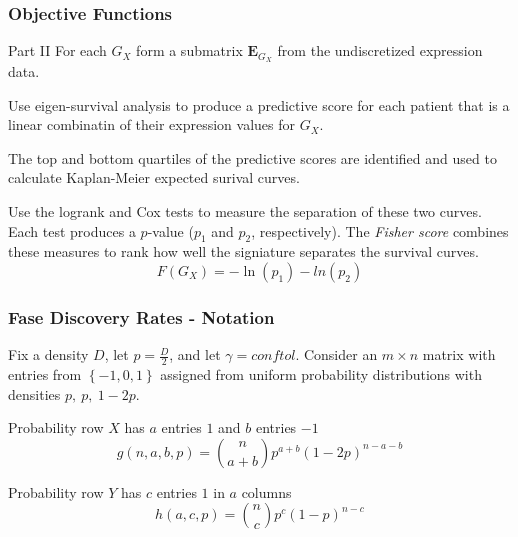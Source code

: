 \documentclass[
	11pt, %
]{beamer}
\begin{document}
\begin{frame}
    \frametitle{Objective Functions}
    \begin{block}{Part II}
        For each $G_X$ form a submatrix $\mathbf{E}_{G_X}$ from the undiscretized expression data.
        
        \smallskip
        
        Use eigen-survival analysis to produce a predictive score for each patient that is a linear combinatin of their expression values for $G_X$.

        \smallskip

        The top and bottom quartiles of the predictive scores are identified and used to calculate Kaplan-Meier expected surival curves.

        \smallskip

        Use the logrank and Cox tests to measure the separation of these two curves. Each test produces a $p$-value ($p_1$ and $p_2$, respectively). The \emph{Fisher score} combines these measures to rank how well the signiature separates the survival curves.
        \begin{equation*}
            F(G_X) = -\ln(p_1)-ln(p_2)
        \end{equation*}
    \end{block}
\end{frame}

\begin{frame}
    \frametitle{Fase Discovery Rates - Notation}

    Fix a density $D$, let $p=\frac{D}{2}$, and let $\gamma = conftol$. Consider an $m \times n$ matrix with entries from $\left\{ -1, 0, 1 \right\}$ assigned from uniform probability distributions with densities $p,\ p,\ 1-2p$.
    
    \smallskip

    \begin{block}{Probability row $X$ has $a$ entries $1$ and $b$ entries $-1$}
        \begin{equation*}
            g(n,a,b,p) = \binom{n}{a+b}p^{a+b}(1-2p)^{n-a-b}
        \end{equation*}        
    \end{block}

    \begin{block}{Probability row $Y$ has $c$ entries $1$ in $a$ columns}
        \begin{equation*}
            h(a,c,p) = \binom{n}{c}p^{c}(1-p)^{n-c}
        \end{equation*}        
    \end{block}
\end{frame}
\end{document}
